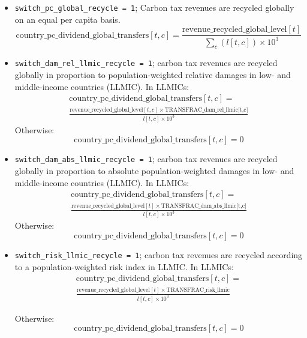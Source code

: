 \documentclass[
]{article}
\begin{document}
\begin{itemize}
\item
  \texttt{switch\_pc\_global\_recycle\ =\ 1}; Carbon tax revenues are
  recycled globally on an equal per capita basis.
  \begin{equation}
 \text{country\_pc\_dividend\_global\_transfers}[t,c] = \frac{\text{revenue\_recycled\_global\_level}[t]}{\sum_c(l[t,c]) \times 10^3} 
\end{equation}

\item
  \texttt{switch\_dam\_rel\_llmic\_recycle\ =\ 1}; carbon tax revenues
  are recycled globally in proportion to population-weighted relative
  damages in low- and middle-income countries (LLMIC). In LLMICs:
 \begin{multline}
  \text{country\_pc\_dividend\_global\_transfers}[t,c] = \\
  \frac{\text{revenue\_recycled\_global\_level}[t,c] \times \text{TRANSFRAC\_dam\_rel\_llmic[t,c]}}{l[t,c] \times 10^3}
 \end{multline}
  Otherwise:
  \begin{equation}
  \text{country\_pc\_dividend\_global\_transfers}[t,c] = 0
  \end{equation}

\item
  \texttt{switch\_dam\_abs\_llmic\_recycle\ =\ 1}; carbon tax revenues
  are recycled globally in proportion to absolute population-weighted
  damages in low- and middle-income countries (LLMIC). In LLMICs:
  \begin{multline}
   \text{country\_pc\_dividend\_global\_transfers}[t,c] = \\
   \frac{\text{revenue\_recycled\_global\_level}[t] \times \text{TRANSFRAC\_dam\_abs\_llmic[t,c]}}{l[t,c] \times 10^3}
  \end{multline}
   Otherwise:
   \begin{equation}
   \text{country\_pc\_dividend\_global\_transfers}[t,c] = 0
   \end{equation}

\item
  \texttt{switch\_risk\_llmic\_recycle\ =\ 1}; carbon tax revenues are recycled according to a population-weighted risk index in LLMIC. 
  In LLMICs:
  \begin{multline}
   \text{country\_pc\_dividend\_global\_transfers}[t,c] = \\
   \frac{\text{revenue\_recycled\_global\_level}[t] \times \text{TRANSFRAC\_risk\_llmic}}{l[t,c] \times 10^3}
  \end{multline}

   Otherwise:
   \begin{equation}
   \text{country\_pc\_dividend\_global\_transfers}[t,c] = 0
   \end{equation}

\end{itemize}
\end{document}
